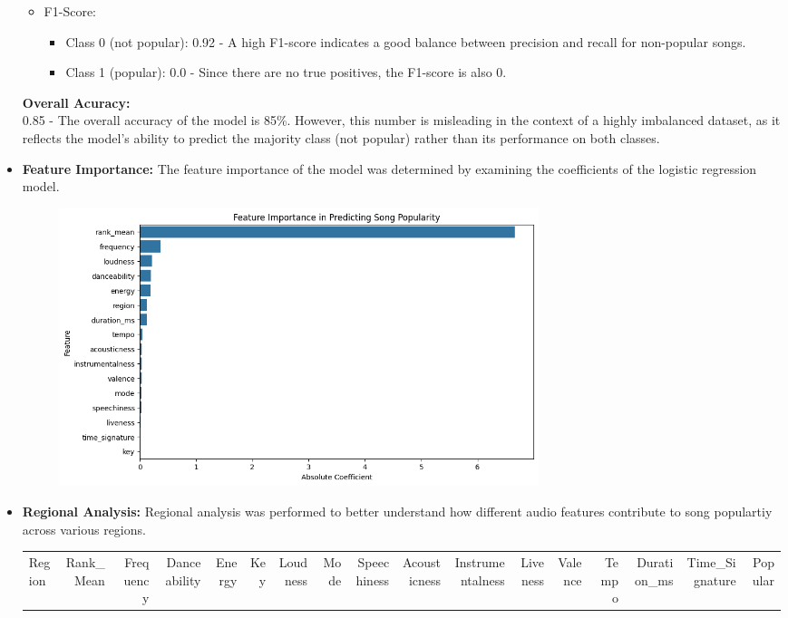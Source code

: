 \begin{itemize}
\begin{itemize}
\begin{itemize}
                \end{itemize}
            \item F1-Score:
                \begin{itemize}
                    \item Class 0 (not popular): 0.92 - A high F1-score indicates a good balance between precision and recall for non-popular songs.
                    \item Class 1 (popular): 0.0 - Since there are no true positives, the F1-score is also 0.
                \end{itemize}
        \end{itemize}
        \textbf{Overall Acuracy: } 
        \\
        0.85 - The overall accuracy of the model is 85\%. However, this number is misleading in the context of a highly imbalanced dataset, as it reflects the model's ability to predict the majority class (not popular) rather than its performance on both classes.
    \item \textbf{Feature Importance: } The feature importance of the model was determined by examining the coefficients of the logistic regression model.
        \begin{figure}[h] 
            \centering 
            \includegraphics[width=0.7\textwidth]{media/logistic_reg_feature_imp.png} 
        \end{figure}
    \item \textbf{Regional Analysis: } Regional analysis was performed to better understand how different audio features contribute to song populartiy across various regions.
    \begin{table}[ht]
        \centering
        \begin{adjustbox}{width=\textwidth}
        \begin{tabular}{lrrrrrrrrrrrrrrrr}
        \toprule
        Region & Rank\_Mean & Frequency & Danceability & Energy & Key & Loudness & Mode & Speechiness & Acousticness & Instrumentalness & Liveness & Valence & Tempo & Duration\_ms & Time\_Signature & Popular \\

\end{tabular}
\end{adjustbox}
\end{table}
\end{itemize}
